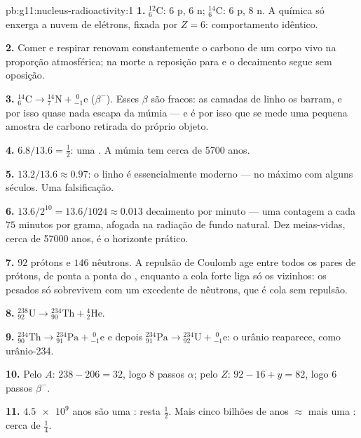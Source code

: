 \begin{solution}{pb:g11:nucleus-radioactivity:1}
\textbf{1.} ${}^{12}_{6}\mathrm{C}$: $6$ p, $6$ n;
${}^{14}_{6}\mathrm{C}$: $6$ p, $8$ n. A química só enxerga a nuvem de
elétrons, fixada por $Z = 6$: comportamento idêntico.

\textbf{2.} Comer e respirar renovam constantemente o carbono de um corpo
vivo na proporção atmosférica; na morte a reposição para e o decaimento
segue sem oposição.

\textbf{3.} ${}^{14}_{6}\mathrm{C} \to {}^{14}_{7}\mathrm{N} +
{}^{\;0}_{-1}\mathrm{e}$ ($\beta^-$). Esses $\beta$ são fracos: as
camadas de linho os barram, e por isso quase nada escapa da múmia --- e é
por isso que se mede uma pequena amostra de carbono retirada do próprio
objeto.

\textbf{4.} $6.8/13.6 = \frac12$: uma . A múmia tem cerca de
\num{5700} anos.

\textbf{5.} $13.2/13.6 \approx 0.97$: o linho é essencialmente moderno
--- no máximo com alguns séculos. Uma falsificação.

\textbf{6.} $13.6/2^{10} = 13.6/1024 \approx 0.013$ decaimento por minuto
--- uma contagem a cada $75$ minutos por grama, afogada na radiação de
fundo natural. Dez meias-vidas, cerca de \num{57000} anos, é o horizonte
prático.

\textbf{7.} $92$ prótons e $146$ nêutrons. A repulsão de Coulomb age
entre todos os pares de prótons, de ponta a ponta do , enquanto a
cola forte liga só os vizinhos: os  pesados só sobrevivem com um
excedente de nêutrons, que é cola sem repulsão.

\textbf{8.} ${}^{238}_{92}\mathrm{U} \to {}^{234}_{90}\mathrm{Th} +
{}^{4}_{2}\mathrm{He}$.

\textbf{9.} ${}^{234}_{90}\mathrm{Th} \to {}^{234}_{91}\mathrm{Pa} +
{}^{\;0}_{-1}\mathrm{e}$ e depois ${}^{234}_{91}\mathrm{Pa} \to
{}^{234}_{92}\mathrm{U} + {}^{\;0}_{-1}\mathrm{e}$: o urânio reaparece,
como urânio-234.

\textbf{10.} Pelo $A$: $238 - 206 = 32$, logo $8$ passos $\alpha$; pelo
$Z$: $92 - 16 + y = 82$, logo $6$ passos $\beta^-$.

\textbf{11.} $\num{4.5e9}$ anos são uma : resta $\frac12$. Mais
cinco bilhões de anos $\approx$ mais uma : cerca de $\frac14$.


\end{solution}
